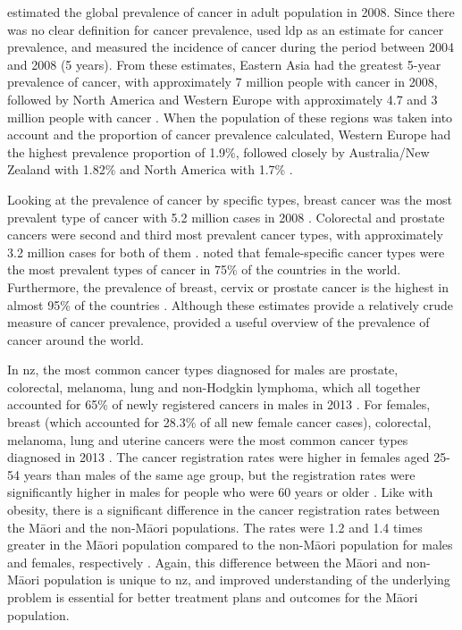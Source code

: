 \citet{Bray2013} estimated the global prevalence of cancer in adult population in 2008.
Since there was no clear definition for cancer prevalence, \citet{Bray2013} used \gls{ldp} as an estimate for cancer prevalence, and measured the incidence of cancer during the period between 2004 and 2008 (5 years).
From these estimates, Eastern Asia had the greatest 5-year prevalence of cancer, with approximately 7 million people with cancer in 2008, followed by North America and Western Europe with approximately 4.7 and 3 million people with cancer \citep{Bray2013}.
When the population of these regions was taken into account and the proportion of cancer prevalence calculated, Western Europe had the highest prevalence proportion of 1.9\%, followed closely by Australia/New Zealand with 1.82\% and North America with 1.7\% \citep{Bray2013}.

Looking at the prevalence of cancer by specific types, breast cancer was the most prevalent type of cancer with 5.2 million cases in 2008 \citep{Bray2013}.
Colorectal and prostate cancers were second and third most prevalent cancer types, with approximately 3.2 million cases for  both of them \citep{Bray2013}.
\citet{Bray2013} noted that female-specific cancer types were the most prevalent types of cancer in 75\% of the countries in the world.
Furthermore, the prevalence of breast, cervix or prostate cancer is the highest in almost 95\% of the countries \citep{Bray2013}.
Although these estimates provide a relatively crude measure of cancer prevalence, \citet{Bray2013} provided a useful overview of the prevalence of cancer  around the world.

In \gls{nz}, the most common cancer types diagnosed for males are prostate, colorectal, melanoma, lung and non-Hodgkin lymphoma, which all together accounted for 65\% of newly registered cancers in males in 2013 \citep{Health2016b}.
For females, breast (which accounted for 28.3\% of all new female cancer cases), colorectal, melanoma, lung and uterine cancers were the most common cancer types diagnosed in 2013 \citep{Health2016b}.
The cancer registration rates were higher in females aged 25-54 years than males of the same age group, but the registration rates were significantly higher in males for people who were 60 years or older \citep{Health2016b}.
Like with obesity, there is a significant difference in the cancer registration rates between the M\=aori and the non-M\=aori populations.
The rates were 1.2 and 1.4 times greater in the M\=aori population compared to the non-M\=aori population for males and females, respectively \citep{Health2016b}.
Again, this difference between the M\=aori and non-M\=aori population is unique to \gls{nz}, and improved understanding of the underlying problem is essential for better treatment plans and outcomes for the M\=aori population.

